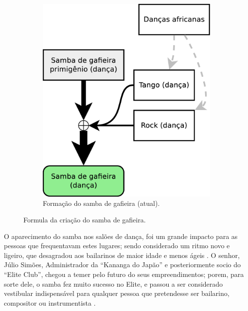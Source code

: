 \begin{figure}[h]
\begin{subfigure}[b]{0.385\textwidth}
    \includegraphics[width=\textwidth]{chapters/cap-historia-sambagafieira/sambagafieiraformula2.eps}
    \caption{Formação do samba de gafieira (atual).}
    \label{fig:formuladosambagafieira2}
  \end{subfigure}
\caption{Formula da criação do samba de gafieira.}
\label{fig:formuladosambagafieiraall}
\end{figure}


O aparecimento do samba nos salões de dança, 
foi um grande impacto para as pessoas que frequentavam estes lugares;
sendo considerado um ritmo novo e ligeiro,
que desagradou aos bailarinos de maior idade e menos ágeis \cite[pp. 6 - cad. B]{entrevistajuliojournalbrasil1}.
O senhor, Júlio Simões, Administrador da ``Kananga do Japão'' e posteriormente socio
do ``Elite Club'', chegou a temer pelo futuro do seus empreendimentos; porem, para sorte dele, 
o samba fez muito sucesso no Elite,
e passou a ser considerado vestibular indispensável para qualquer pessoa que pretendesse ser bailarino, 
compositor ou instrumentista \cite[pp. 6 - cad. B]{entrevistajuliojournalbrasil1}.


